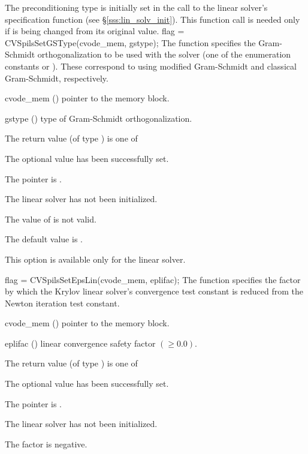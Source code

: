 {
  The preconditioning type is initially set in the call
  to the linear solver's specification function (see \S\ref{sss:lin_solv_init}). 
  This function call is needed only if  is being changed from its original 
  value.
}
{
  flag = CVSpilsSetGSType(cvode\_mem, gstype);
}
{
  The function  specifies the 
  Gram-Schmidt orthogonalization to be used with the {\cvspgmr} solver
  (one of the enumeration constants 
  or ). These correspond to using modified Gram-Schmidt 
  and classical Gram-Schmidt, respectively. 
}
{
  \begin{args}
  \item[cvode\_mem] ()
    pointer to the {\cvodes} memory block.
  \item[gstype] ()
    type of Gram-Schmidt orthogonalization.
  \end{args}
}
{
  The return value  (of type ) is one of
  \begin{args}
  \item[\Id{CVSPILS\_SUCCESS}] 
    The optional value has been successfully set.
  \item[\Id{CVSPILS\_MEM\_NULL}]
    The  pointer is .
  \item[\Id{CVSPILS\_LMEM\_NULL}]
    The {\cvspils} linear solver has not been initialized.
  \item[\Id{CVSPILS\_ILL\_INPUT}]
    The value of  is not valid.
  \end{args}
}
{
  The default value is .

  {\warn}This option is available only for the {\cvspgmr} linear solver.
}
{
  flag = CVSpilsSetEpsLin(cvode\_mem, eplifac);
}
{
  The function  specifies the factor by
  which the Krylov linear solver's convergence test constant is reduced
  from the Newton iteration test constant.
}
{
  \begin{args}
  \item[cvode\_mem] ()
    pointer to the {\cvodes} memory block.
  \item[eplifac] () linear convergence safety factor $( \geq 0.0)$.

  \end{args}
}
{
  The return value  (of type ) is one of
  \begin{args}
  \item[\Id{CVSPILS\_SUCCESS}] 
    The optional value has been successfully set.
  \item[\Id{CVSPILS\_MEM\_NULL}]
    The  pointer is .
  \item[\Id{CVSPILS\_LMEM\_NULL}]
    The {\cvspils} linear solver has not been initialized.
  \item[\Id{CVSPILS\_ILL\_INPUT}]
    The factor  is negative.  
  \end{args}
}
